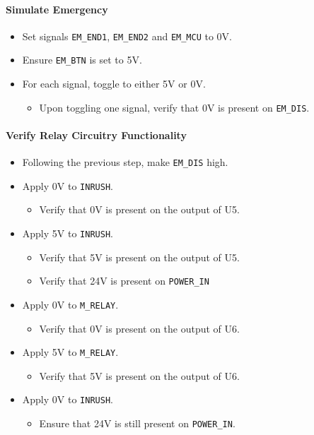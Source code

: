 \paragraph{Simulate Emergency} %
\label{par:simulate_no_emergency}
\begin{itemize}
	\item Set signals \texttt{EM\_END1}, \texttt{EM\_END2} and \texttt{EM\_MCU} to 0V.
	\item Ensure \texttt{EM\_BTN} is set to 5V.
	\item For each signal, toggle to either 5V or 0V.
	\begin{itemize}
		\item Upon toggling one signal, verify that 0V is present on \texttt{EM\_DIS}.
	\end{itemize}
\end{itemize}
\paragraph{Verify Relay Circuitry Functionality} %
\label{par:verify_relay_circuitry}
\begin{itemize}
	\item Following the previous step, make \texttt{EM\_DIS} high.
	\item Apply 0V to \texttt{INRUSH}.
	\begin{itemize}
		\item Verify that 0V is present on the output of U5.
	\end{itemize}
	\item Apply 5V to \texttt{INRUSH}.
	\begin{itemize}
		\item Verify that 5V is present on the output of U5.
		\item Verify that 24V is present on \texttt{POWER\_IN}
	\end{itemize}
	\item Apply 0V to \texttt{M\_RELAY}.
	\begin{itemize}
		\item Verify that 0V is present on the output of U6.
	\end{itemize}
	\item Apply 5V to \texttt{M\_RELAY}.
	\begin{itemize}
		\item Verify that 5V is present on the output of U6.
	\end{itemize}
	\item Apply 0V to \texttt{INRUSH}.
	\begin{itemize}
		\item Ensure that 24V is still present on \texttt{POWER\_IN}.
	\end{itemize}
\end{itemize}
